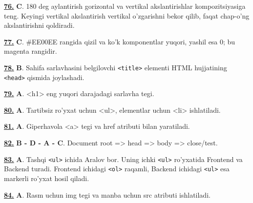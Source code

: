\documentclass[10pt,a4paper,oneside]{article}
\begin{document}
\noindent\hyperlink{q76}{\textbf{76.}} \textbf{C}.  180 deg  aylantirish gorizontal va vertikal akslantirishlar kompozitsiyasiga teng. Keyingi vertikal akslantirish vertikal o'zgarishni bekor qilib, faqat chap-o'ng akslantirishni qoldiradi.
\par\vspace{3mm}
\noindent\hyperlink{q77}{\textbf{77.}} \textbf{C}.  \#EE00EE rangida qizil va ko'k komponentlar yuqori, yashil esa 0; bu magenta rangidir.
\par\vspace{3mm}
\noindent\hyperlink{q78}{\textbf{78.}} \textbf{B}.  Sahifa sarlavhasini belgilovchi \texttt{\textless{}title\textgreater{}} elementi HTML hujjatining \texttt{\textless{}head\textgreater{}} qismida joylashadi.
\par\vspace{3mm}
\noindent\hyperlink{q79}{\textbf{79.}} \textbf{A}.  \textless{}h1\textgreater{} eng yuqori darajadagi sarlavha tegi.
\par\vspace{3mm}
\noindent\hyperlink{q80}{\textbf{80.}} \textbf{A}.  Tartibsiz ro'yxat uchun \textless{}ul\textgreater{}, elementlar uchun \textless{}li\textgreater{} ishlatiladi.
\par\vspace{3mm}
\noindent\hyperlink{q81}{\textbf{81.}} \textbf{A}.  Giperhavola \textless{}a\textgreater{} tegi va href atributi bilan yaratiladi.
\par\vspace{3mm}
\noindent\hyperlink{q82}{\textbf{82.}} \textbf{B - D - A - C}.  Document root =\textgreater{} head =\textgreater{} body =\textgreater{} close/test.
\par\vspace{3mm}
\noindent\hyperlink{q83}{\textbf{83.}} \textbf{A}.  Tashqi \texttt{\textless{}ul\textgreater{}} ichida Aralov bor. Uning ichki \texttt{\textless{}ul\textgreater{}} ro'yxatida Frontend va Backend turadi. Frontend ichidagi \texttt{\textless{}ol\textgreater{}} raqamli, Backend ichidagi \texttt{\textless{}ul\textgreater{}} esa markerli ro'yxat hosil qiladi.
\par\vspace{3mm}
\noindent\hyperlink{q84}{\textbf{84.}} \textbf{A}.  Rasm uchun img tegi va manba uchun src atributi ishlatiladi.
\end{document}

